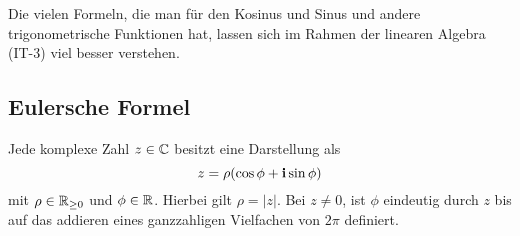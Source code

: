 \begin{bem} 
	Die vielen Formeln, die man für den Kosinus und Sinus und andere trigonometrische Funktionen hat, lassen sich im Rahmen der linearen Algebra (IT-3) viel besser verstehen. 
\end{bem} 

\subsection{Eulersche Formel} 

\begin{thm} \label{thm:z:betr:arg}
	Jede komplexe Zahl $z \in \mathbb{C}$ besitzt eine Darstellung als 
	\[
		z = \rho ( \cos \phi + \mathbf{i} \sin \phi )
	\]
	mit $\rho \in \mathbb{R}_{\ge 0}$ und $\phi \in \mathbb{R}$. Hierbei gilt $\rho = |z|$. Bei $z \ne 0$, ist $\phi$ eindeutig durch $z$ bis auf das addieren eines ganzzahligen Vielfachen von $2 \pi$ definiert. 
\end{thm}

